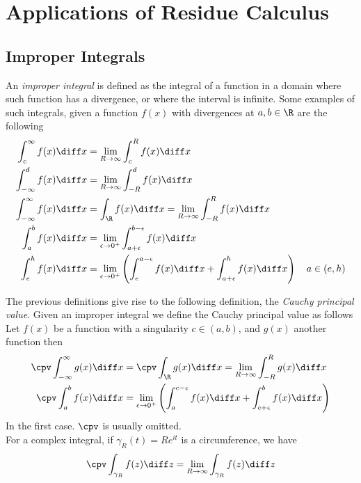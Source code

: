 \documentclass[../mmf.tex]{subfiles}
\begin{document}
\section{Applications of Residue Calculus}
\subsection{Improper Integrals}
\begin{dfn}
	An \textit{improper integral} is defined as the integral of a function in a domain where such function has a divergence, or where the interval is infinite.
	Some examples of such integrals, given a function $f(x)$ with divergences at $a,b\in\R$ are the following
	\begin{equation*}
		\begin{aligned}
			\int_{c}^{\infty}f(x)\diff x&=\lim_{R\to\infty}\int_{c}^{R}f(x)\diff x\\
			\int_{-\infty}^{d}f(x)\diff x&=\lim_{R\to\infty}\int_{-R}^{d}f(x)\diff x\\
			\int_{-\infty}^{\infty}f(x)\diff x&=\int_{\R}^{}f(x)\diff x=\lim_{R\to\infty}\int_{-R}^{R}f(x)\diff x\\
			\int_{a}^{b}f(x)\diff x&=\lim_{\epsilon\to0^+}\int_{a+\epsilon}^{b-\epsilon}f(x)\diff x\\
			\int_{e}^h f(x)\diff x&=\lim_{\epsilon\to0^+}\left( \int_{e}^{a-\epsilon}f(x)\diff x+\int_{a+\epsilon}^{h}f(x)\diff x \right)\quad a\in(e,h)
		\end{aligned}
	\end{equation*}
\end{dfn}
\begin{dfn}
	The previous definitions give rise to the following definition, the \textit{Cauchy principal value}. Given an improper integral we define the Cauchy principal value as follows\\
	Let $f(x)$ be a function with a singularity $c\in(a,b)$, and $g(x)$ another function then
	\begin{equation*}
		\begin{aligned}
			\cpv\int_{-\infty}^{\infty}g(x)\diff x&=\cpv\int_{\R}^{}g(x)\diff x=\lim_{R\to\infty}\int_{-R}^{R}g(x)\diff x\\
			\cpv\int_{a}^{b}f(x)\diff x&=\lim_{\epsilon\to0^+}\left(\int_{a}^{c-\epsilon}f(x)\diff x+\int_{c+\epsilon}^{b}f(x)\diff x\right)
		\end{aligned}
	\end{equation*}
	In the first case. $\cpv$ is usually omitted.\\
	For a complex integral, if $\gamma_R(t)=Re^{it}$ is a circumference, we have
	\begin{equation*}
		\cpv\int_{\gamma_R}^{}f(z)\diff z=\lim_{R\to\infty}\int_{\gamma_R}f(z)\diff z
	\end{equation*}
\end{dfn}
\end{document}
